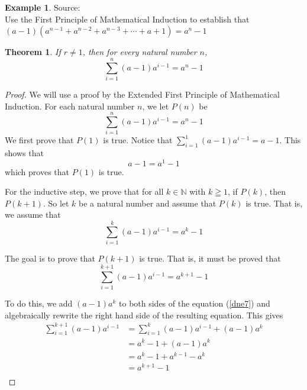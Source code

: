 \documentclass{book}
\newtheorem{theorem}{Theorem}[section]
\theoremstyle{definition}
\newtheorem{example}{Example}[definition]
\theoremstyle{remark}
\newcommand{\bb}[1]{\mathbb{#1}}
\begin{document}
\newpage
\begin{example}
Source: \cite[Chap.1, S.1.1, Prob.1.1, Q.3]{david} \\ 

Use the First Principle of Mathematical Induction to establish that $(a-1)(a^{n-1} + a^{n-2} + a^{n-3} + \cdots + a + 1) = a^n - 1$
    \begin{tcolorbox}
        \begin{theorem}
            If $r \neq 1$, then for every natural number $n$,
                \begin{equation*}
                    \sum_{i=1}^{n}{(a-1)a^{i-1}} = a^n - 1
                \end{equation*}
        \end{theorem}
    \end{tcolorbox}

    \begin{proof}
        We will use a proof by the Extended First Principle of Mathematical Induction. For each natural number $n$, we let $P(n)$ be
            \begin{equation*}
                \sum_{i=1}^{n}{(a-1)a^{i-1}} = a^n - 1
            \end{equation*}
        We first prove that $P(1)$ is true. Notice that $\sum_{i=1}^{1}{(a-1)a^{i-1}} = a-1$. This shows that   
            \begin{equation*}
                 a-1 = a^1 - 1
            \end{equation*}
        which proves that $P(1)$ is true. 
        
        For the inductive step, we prove that for all $k \in \bb{N}$ with $k \geqq 1$, if $P(k)$, then $P(k+1)$. So let $k$ be a natural number and assume that $P(k)$ is true. That is, we assume that 
            \begin{equation*}
                \sum_{i=1}^{k}{(a-1)a^{i-1}} = a^k - 1               
            \end{equation*}
        
        The goal is to prove that $P(k+1)$ is true. That is, it must be proved that  
            \begin{equation}
            \label{dne7}
                \sum_{i=1}^{k+1}{(a-1)a^{i-1}} = a^{k+1} - 1          
            \end{equation}
        
        To do this, we add $(a-1)a^k$ to both sides of the equation (\ref{dne7}) and algebraically rewrite the right hand side of the resulting equation. This gives
            \begin{align*}
                \sum_{i=1}^{k+1}{(a-1)a^{i-1}} & = \sum_{i=1}^{k}{(a-1)a^{i-1}} + (a-1)a^k \\
                    & = a^k -1 + (a-1)a^k \\
                    & = a^k - 1 + a^{k-1} - a^k \\
                    & = a^{k+1} - 1 \\
        \end{align*}
        

\end{proof}
\end{example}
\end{document}
